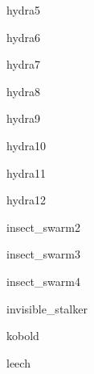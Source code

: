 \documentclass[letterpaper,serif]{module}
\begin{document}
\begin{newmonster}{hydra5}\end{newmonster}

\begin{newmonster}{hydra6}\end{newmonster}

\begin{newmonster}{hydra7}\end{newmonster}

\begin{newmonster}{hydra8}\end{newmonster}

\begin{newmonster}{hydra9}\end{newmonster}

\begin{newmonster}{hydra10}\end{newmonster}

\begin{newmonster}{hydra11}\end{newmonster}

\begin{newmonster}{hydra12}\end{newmonster}

\begin{newmonster}{insect_swarm2}\end{newmonster}

\begin{newmonster}{insect_swarm3}\end{newmonster}

\begin{newmonster}{insect_swarm4}\end{newmonster}

\begin{newmonster}{invisible_stalker}\end{newmonster}

\begin{newmonster}{kobold}\end{newmonster}

\begin{newmonster}{leech}\end{newmonster}
\end{document}

